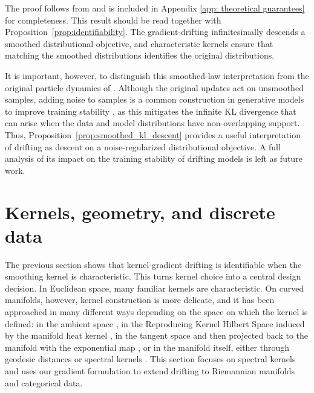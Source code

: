 \documentclass{article}
\theoremstyle{plain}
\begin{document}
The proof follows from \cite{weber2023score} and is included in Appendix \ref{app: theoretical guarantees} for completeness. This result should be read together with Proposition~\ref{prop:identifiability}.
The gradient-drifting infinitesimally descends a smoothed distributional objective, and characteristic kernels ensure that matching the smoothed distributions identifies the original distributions.  

It is important, however, to distinguish this smoothed-law interpretation from
the original particle dynamics of \citep{Deng_2026_Drift}. Although the original updates act on unsmoothed samples, adding noise to samples is a common construction in generative models to improve training stability \citep{sonderby2017amortised, mescheder2018which}, as this mitigates the infinite KL divergence that can arise when the data and model distributions have non-overlapping support. Thus, Proposition~\ref{prop:smoothed_kl_descent} provides a useful interpretation of
drifting as descent on a noise-regularized distributional objective. A full
analysis of its impact on the training stability of drifting models is left as
future work.


\section{Kernels, geometry, and discrete data}
\label{sec:kernels_geometry_discrete}

The previous section shows that kernel-gradient drifting is identifiable when the smoothing kernel is characteristic. This turns kernel choice into a central design decision. In Euclidean space, many familiar kernels are characteristic. On curved manifolds, however, kernel construction is more delicate, and it has been approached in many different ways depending on the space on which the kernel is defined: in the ambient space \cite{ozakin2009submanifold,BaePolonik2026KernelSmoothing}, in the Reproducing Kernel Hilbert Space induced by the manifold heat kernel \cite{Caseiro2012SemiIntrinsicMeanShift}, in the tangent space and then projected back to the manifold with the exponential map \cite{KimPark2013GeometricStructures, WuWu2022StrongUniformConsistency}, or in the manifold itself, either through geodesic distances \cite{pelletier2005kernel} or spectral kernels \cite{Cleanthous2020KernelWaveletDensity}. This section focuses on spectral kernels and uses our gradient formulation to extend drifting to Riemannian manifolds and categorical data.
\end{document}

